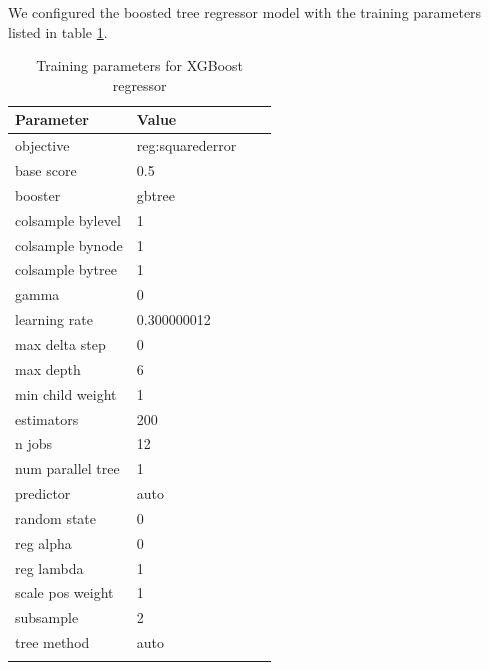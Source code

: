 \documentclass[sn-mathphys]{sn-jnl}%
\theoremstyle{thmstyleone}%
\theoremstyle{thmstyletwo}%
\theoremstyle{thmstylethree}%
\begin{document}
We configured the boosted tree regressor model with the training parameters listed in table \ref{table_xgboost_training_params}.

\begin{table}[h]
      \begin{center}
      \begin{minipage}{174pt}
      \caption{Training parameters for XGBoost regressor}\label{table_xgboost_training_params}%
      \begin{tabular}{@{}llll@{}}
      \toprule
      Parameter               & Value \\
      \midrule
      objective               & reg:squarederror  \\
      base score              & 0.5 \\
      booster                 & gbtree  \\
      colsample bylevel       & 1 \\
      colsample bynode        & 1 \\
      colsample bytree        & 1 \\
      gamma\footnotemark[1]   & 0 \\
      learning rate           & 0.300000012 \\
      max delta step          & 0 \\
      max depth               & 6 \\
      min child weight        & 1 \\
      estimators              & 200  \\
      n jobs                  & 12  \\
      num parallel tree       & 1 \\
      predictor               & auto  \\
      random state            & 0 \\
      reg alpha               & 0 \\
      reg lambda              & 1 \\
      scale pos weight        & 1 \\
      subsample               & 2 \\
      tree method             & auto  \\
      \botrule
      \end{tabular}
      \end{minipage}
      \end{center}
\end{table}
\end{document}
